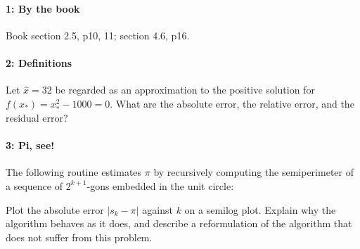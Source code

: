 \documentclass[12pt, leqno]{article}
\begin{document}

\paragraph*{1: By the book}
Book section 2.5, p10, 11; section 4.6, p16.

\paragraph*{2: Definitions}
Let $\hat{x} = 32$ be regarded as an approximation to the positive
solution for $f(x_*) = x_*^2 - 1000 = 0$.  What are the absolute
error, the relative error, and the residual error?

\paragraph*{3: Pi, see!}
The following routine estimates $\pi$ by recursively computing the
semiperimeter of a sequence of $2^{k+1}$-gons embedded in the unit circle:
\lstset{language=matlab,frame=lines,columns=flexible}

Plot the absolute error $|s_k-\pi|$ against $k$ on a semilog plot.
Explain why the algorithm behaves as it does, and describe a
reformulation of the algorithm that does not suffer from this problem.
\end{document}
